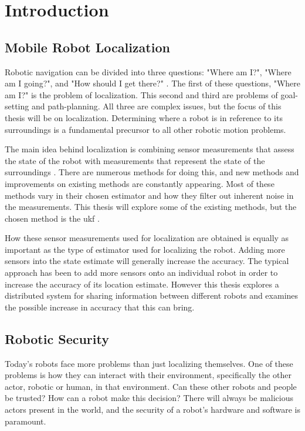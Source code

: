 \documentclass[thesis.tex]{subfile}
\begin{document}
\chapter{Introduction} \label{Introduction}
\section{Mobile Robot Localization} \label{Mobile Robot Localization}
Robotic navigation can be divided into three questions: "Where am I?", "Where am I going?", and "How should I get there?" \cite{Leonard1991}. The first of these questions, "Where am I?" is the problem of localization. This second and third are problems of goal-setting and path-planning. All three are complex issues, but the focus of this thesis will be on localization. Determining where a robot is in reference to its surroundings is a fundamental precursor to all other robotic motion problems.

The main idea behind localization is combining sensor measurements that assess the state of the robot with measurements that represent the state of the surroundings \cite{Roumeliotis2002}. There are numerous methods for doing this, and new methods and improvements on existing methods are constantly appearing. Most of these methods vary in their chosen estimator and how they filter out inherent noise in the measurements. This thesis will explore some of the existing methods, but the chosen method is the \gls{ukf} \cite{Julier1997}.

How these sensor measurements used for localization are obtained is equally as important as the type of estimator used for localizing the robot. Adding more sensors into the state estimate will generally increase the accuracy. The typical approach has been to add more sensors onto an individual robot in order to increase the accuracy of its location estimate. However this thesis explores a distributed system for sharing information between different robots and examines the possible increase in accuracy that this can bring.

\section{Robotic Security} \label{Robotic Security}
Today's robots face more problems than just localizing themselves. One of these problems is how they can interact with their environment, specifically the other actor, robotic or human, in that environment. Can these other robots and people be trusted? How can a robot make this decision? There will always be malicious actors present in the world, and the security of a robot's hardware and software is paramount.
\end{document}
